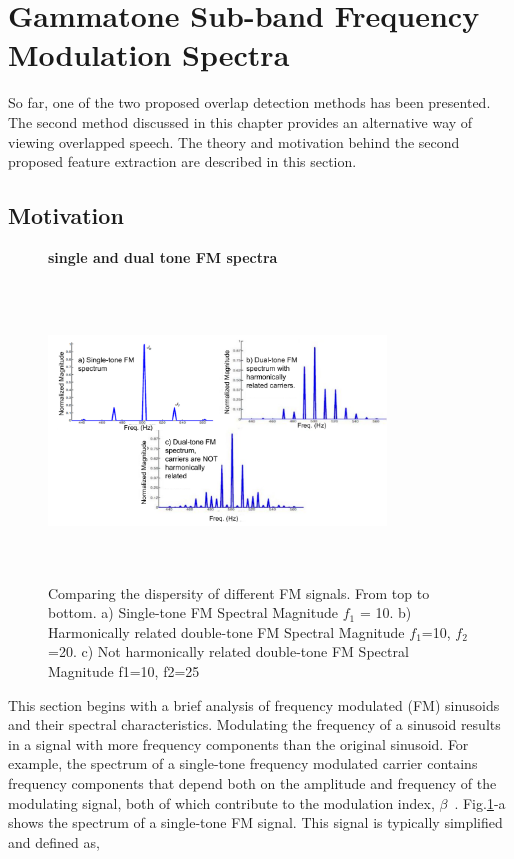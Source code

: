 {\section{Gammatone Sub-band Frequency Modulation Spectra}
\label{sec:ch2_GSFM}
So far, one of the two proposed overlap detection methods has been presented. 
The second method discussed in this chapter provides an alternative way of viewing overlapped speech. 
The theory and motivation behind the second proposed feature extraction are described in this section. 

\subsection{Motivation}

\begin{figure}[b!]
	\centering
	\hspace{-1mm}
	\textbf{single and dual tone FM spectra}\par\medskip
	\includegraphics[height = 3.1in, width=0.8\textwidth]{figures/tone_FM_spectra}
	\vspace{-1mm}
	\caption{ Comparing the dispersity of different FM signals.
		From top to bottom. 
		a) Single-tone FM Spectral Magnitude $f_1$ = 10. 
		b) Harmonically related double-tone FM Spectral Magnitude $f_1$=10, $f_2$=20. 
		c) Not harmonically related double-tone FM Spectral Magnitude f1=10, f2=25}
	\vspace{0mm}
	\label{fig:ch2_tone_fm_spectra}
\end{figure}

This section begins with a brief analysis of frequency modulated (FM) sinusoids and their spectral characteristics. 
Modulating the frequency of a sinusoid results in a signal with more frequency components than the original sinusoid. 
For example, the spectrum of a single-tone frequency modulated carrier contains frequency components that depend both on the amplitude and frequency of the modulating signal, both of which contribute to the modulation index, $\beta$~\cite{carlson2010communication}. 
Fig.\ref{fig:ch2_tone_fm_spectra}-a shows the spectrum of a single-tone FM signal. 
This signal is typically simplified and defined as, 

}
